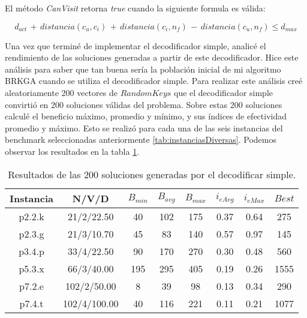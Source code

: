 \bigskip

\begin{mycapequ}[!ht]
	\caption{El método \textit{CanVisit} retorna \textit{true} cuando la siguiente formula es válida:}
	\begin{equation} \label{eq:canVisit}
	d_{act}\, +\, distancia(c_u, c_i)\, +\, distancia(c_i, n_f)\, -\, distancia(c_u, n_f) \leq d_{max}
	\end{equation}
\end{mycapequ}

\bigskip

Una vez que terminé de implementar el decodificador simple, analicé el rendimiento de las soluciones generadas a partir de este decodificador. Hice este análisis para saber que tan buena sería la población inicial de mi algoritmo BRKGA cuando se utiliza el decodificador simple. Para realizar este análisis creé aleatoriamente 200 vectores de $RandomKeys$ que el decodificador simple convirtió en 200 soluciones válidas del problema. Sobre estas 200 soluciones calculé el beneficio máximo, promedio y mínimo, y sus índices de efectividad promedio y máximo. Esto se realizó para cada una de las seis instancias del benchmark seleccionadas anteriormente \ref{tab:instanciasDiversas}. Podemos observar los resultados en la tabla \ref{tab:resultadosDecoSimple}.

\bigskip

\begin{table}
\begin{center}
\begin{tabular}{ |c|c|c|c|c|c|c|c| } 
\hline
Instancia & N/V/D & $B_{min}$ & $B_{avg}$ & $B_{max}$ & $i_{eAvg}$ & $i_{eMax}$ & $Best$ \\
\hline
p2.2.k & 21/2/22.50 & 40 & 102 & 175 & 0.37 & 0.64 & 275 \\
p2.3.g & 21/3/10.70 & 45 & 83 & 140 & 0.57 & 0.97 & 145 \\
p3.4.p & 33/4/22.50 & 90 & 170 & 270 & 0.30 & 0.48 & 560 \\
p5.3.x & 66/3/40.00 & 195 & 295 & 405 & 0.19 & 0.26 & 1555 \\
p7.2.e & 102/2/50.00 & 8 & 39 & 98 & 0.13 & 0.34 & 290 \\
p7.4.t & 102/4/100.00 & 40 & 116 & 221 & 0.11 & 0.21 & 1077 \\
\hline
\end{tabular}
\end{center}
\caption{Resultados de las 200 soluciones generadas por el decodificar simple.}
\label{tab:resultadosDecoSimple}
\end{table}

